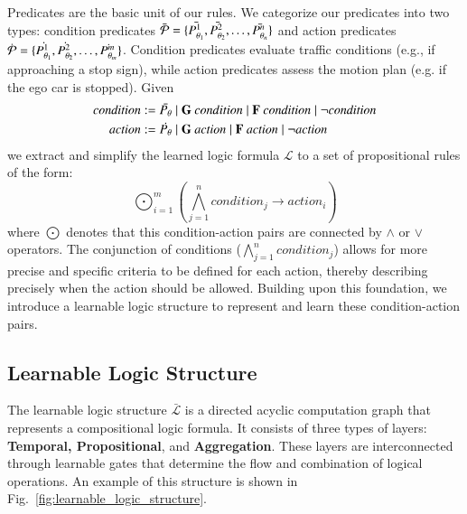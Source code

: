Predicates are the basic unit of our rules. We categorize our predicates into two types: condition predicates $\bar{\mathcal{P}} = \{\bar{P^{1}_{\theta_1}}, \bar{P^{2}_{\theta_2}}, \ldots, \bar{P^{n}_{\theta_n}}\}$ and action predicates $\dot{\mathcal{P}} = \{\dot{P^{1}_{\theta_1}}, \dot{P^{2}_{\theta_2}}, \ldots, \dot{P^{m}_{\theta_m}}\}$. Condition predicates evaluate traffic conditions (e.g., if approaching a stop sign), while action predicates assess the motion plan (e.g. if the ego car is stopped). Given
\begin{equation}
    \begin{aligned}
        \mathit{condition} & := \bar{\Predicate} \mid \G\ condition \mid \F\ \mathit{condition} \mid \lnot \mathit{condition} \\
        \mathit{action}    & := \dot{\Predicate} \mid \G\ \mathit{action} \mid \F\ \mathit{action} \mid \lnot \mathit{action}
    \end{aligned}
\end{equation}
we extract and simplify the learned logic formula $\mathcal{L}$ to a set of propositional rules of the form:
\begin{equation}
    \bigodot_{i=1}^m \left(\bigwedge_{j=1}^n condition_j \rightarrow action_i\right)
    \label{eq:condition_action_pair}
\end{equation}
where $\bigodot$ denotes that this condition-action pairs are connected by $\land$ or $\lor$ operators. The conjunction of conditions ($\bigwedge_{j=1}^n condition_j$) allows for more precise and specific criteria to be defined for each action, thereby describing precisely when the action should be allowed. Building upon this foundation, we introduce a learnable logic structure to represent and learn these condition-action pairs.


\subsection{Learnable Logic Structure}
\label{sec:learnable_logic_structure}

The learnable logic structure $\bar{\mathcal{L}}$ is a directed acyclic computation graph that represents a compositional logic formula. It consists of three types of layers: \textbf{Temporal, Propositional}, and \textbf{Aggregation}. These layers are interconnected through learnable gates that determine the flow and combination of logical operations. An example of this structure is shown in Fig.~\ref{fig:learnable_logic_structure}.

